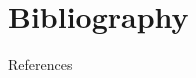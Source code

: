 \documentclass[10pt, aspectratio=169]{beamer}
\begin{document}



\section*{Bibliography}
\renewcommand{\bibfont}{\footnotesize}
\begin{frame}[allowframebreaks]{References}
  \printbibliography
\end{frame}
\end{document}
